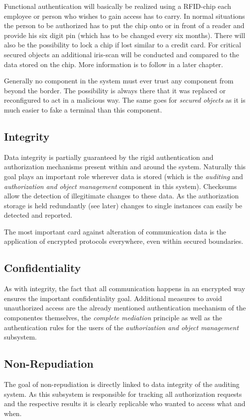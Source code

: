 \documentclass[12pt,a4paper,titlepage,oneside]{scrartcl}
\begin{document}
Functional authentication will basically be realized using a RFID-chip each employee or person who wishes to gain access has to carry.
In normal situations the person to be authorized has to put the chip onto or in front of a reader and provide his six digit pin
(which has to be changed every six months). There will also be the possibility to lock a chip if lost similar to a credit card.
For critical secured objects an additional iris-scan will be conducted and compared to the data stored on the chip.
More information is to follow in a later chapter.

Generally no component in the system must ever trust any component from beyond the border. The possibility is always there that
it was replaced or reconfigured to act in a malicious way. The same goes for \emph{secured objects} as it is much easier to
fake a terminal than this component.


\subsection{Integrity}
Data integrity is partially guaranteed by the rigid authentication and authorization mechanisms present within and around the system.
Naturally this goal plays an important role wherever data is stored (which is the \emph{auditing} and \emph{authorization and object management}
component in this system). Checksums allow the detection of illegitimate changes to these data. As the authorization storage is held
redundantly (see later) changes to single instances can easily be detected and reported.

The most important card against alteration of communication data is the application of encrypted protocols everywhere, even within
secured boundaries.


\subsection{Confidentiality}
As with integrity, the fact that all communication happens in an encrypted way ensures the important confidentiality goal. Additional
measures to avoid unauthorized access are the already mentioned authentication mechanism of the componentes themselves, the
\emph{complete mediation} principle as well as the authentication rules for the users of the \emph{authorization and object management}
subsystem.


\subsection{Non-Repudiation}
The goal of non-repudiation is directly linked to data integrity of the auditing system. As this subsystem is responsible for tracking
all authorization requests and the respective results it is clearly replicable who wanted to access what and when.
\end{document}
